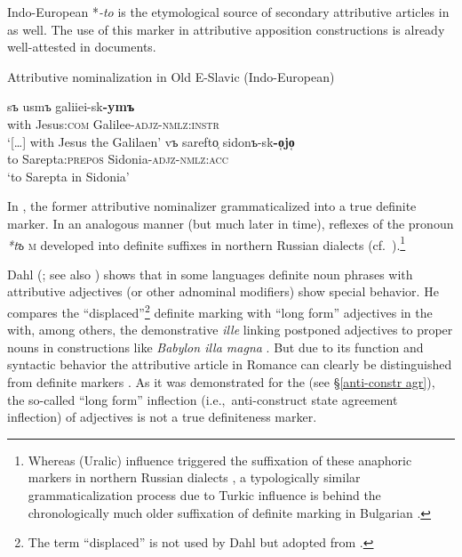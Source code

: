 {
Indo-European *\textit{-to} is the etymological source of secondary attributive articles in  as well. The use of this marker in attributive apposition constructions is already well-attested in  documents.
\begin{exe}
\ex \rm{Attributive nominalization in Old E-Slavic (Indo-European)}
\begin{xlist}
\ex
\gll	[\dots] sъ usmъ galiiei-sk\textbf{-ymъ}\\
	{ } with Jesus:\textsc{com} Galilee-\textsc{adjz}-\textsc{nmlz:instr}\\
\glt 	‘[\dots] with Jesus the Galilaen’ \citep[Matthew 26, cit.][214]{mendoza2004}
\ex 
\gll	vъ sarefto̜ sidonъ-sk\textbf{-o̜jo̜}\\
	to Sarepta:\textsc{prepos} Sidonia-\textsc{adjz}-\textsc{nmlz:acc}\\
\glt 	‘to Sarepta in Sidonia’ \citep[Luke 4, cit.][214]{mendoza2004}
\end{xlist}
\end{exe}
In , the former attributive nominalizer grammaticalized into a true definite marker. In an analogous manner (but much later in time), reflexes of the  pronoun \textit{*tъ} \textsc{m} developed into definite suffixes in northern Russian dialects (cf.~\citealt
{leinonen2006a}).\footnote{Whereas  (Uralic) influence triggered the suffixation of these anaphoric markers in northern Russian dialects \citep
{leinonen2006a}, a typologically similar grammaticalization process due to Turkic influence is behind the chronologically much older suffixation of definite marking in Bulgarian \citep[114–122]{kusmenko2008}.}

Dahl (\citeyear[149–152]{dahl2003}; see also \citealt[122–123]{dahl2015a}) shows that in some languages definite noun phrases with attributive adjectives (or other adnominal modifiers) show special behavior. He compares the “displaced”\footnote{The term “displaced” is not used by Dahl but adopted from \citet[114–116]{melcuk2006}.} definite marking with “long form” adjectives in the  with, among others, the demonstrative \textit{ille} linking postponed adjectives to proper nouns in  constructions like \textit{Babylon illa magna} \cite[150]{dahl2003}. But due to its function and syntactic behavior the attributive article in Romance can clearly be distinguished from definite markers \citep[329]{gamillscheg1937}. As it was demonstrated for the  (see \S\ref{anti-constr agr}), the so-called “long form” inflection (i.e.,~anti\hyp{}construct state agreement inflection) of adjectives is not a true definiteness marker.

}
